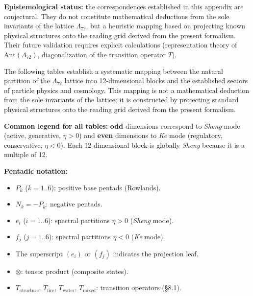 \documentclass[11pt]{article}
\begin{document}
\noindent \textbf{Epistemological status:} the correspondences
established in this appendix are conjectural. They do not constitute
mathematical deductions from the sole invariants of the lattice
\(\Lambda_{72}\), but a heuristic mapping based on projecting known
physical structures onto the reading grid derived from the present
formalism. Their future validation requires explicit calculations
(representation theory of \(\text{Aut}(\Lambda_{72})\), diagonalization
of the transition operator \(T\)).

\noindent The following tables establish a systematic mapping between
the natural partition of the \(\Lambda_{72}\) lattice into
12-dimensional blocks and the established sectors of particle physics
and cosmology. This mapping is not a mathematical deduction from the
sole invariants of the lattice; it is constructed by projecting standard
physical structures onto the reading grid derived from the present
formalism.

\vspace{0.3cm}

\noindent \textbf{Common legend for all tables:} \textbf{odd} dimensions
correspond to \textit{Sheng} mode (active, generative, \(\eta>0\)) and
\textbf{even} dimensions to \textit{Ke} mode (regulatory, conservative,
\(\eta<0\)). Each 12-dimensional block is globally \textit{Sheng}
because it is a multiple of 12.

\vspace{0.3cm}

\noindent \textbf{Pentadic notation:}

\begin{itemize}
    \item $P_k$ ($k=1..6$): positive base pentads (Rowlands).
    \item $N_k = -P_k$: negative pentads.
    \item $e_i$ ($i=1..6$): spectral partitions $\eta>0$ (\textit{Sheng} mode).
    \item $f_j$ ($j=1..6$): spectral partitions $\eta<0$ (\textit{Ke} mode).
    \item The superscript $(e_i)$ or $(f_j)$ indicates the projection leaf.
    \item $\otimes$: tensor product (composite states).
    \item $T_{\text{structure}}$, $T_{\text{fire}}$, $T_{\text{water}}$, $T_{\text{mixed}}$: transition operators (§8.1).
\end{itemize}

\begingroup
\centering
\end{document}
